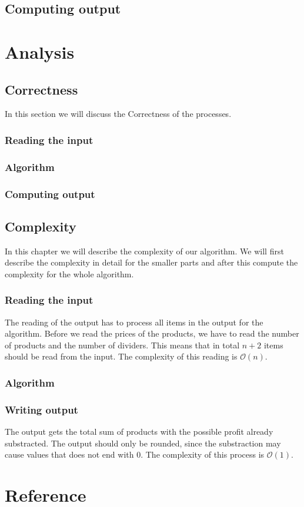 \documentclass{article}
\newcommand{\bigO}[1]{\mathcal{O}(#1)}
\begin{document}
\subsection{Computing output}

\newpage
\section{Analysis}

\subsection{Correctness}
In this section we will discuss the Correctness of the processes.

\subsubsection{Reading the input}

\subsubsection{Algorithm}

\subsubsection{Computing output}

\subsection{Complexity}
In this chapter we will describe the complexity of our algorithm. We will first describe the complexity in detail for the smaller parts and after this compute the complexity for the whole algorithm.

\subsubsection{Reading the input}
The reading of the output has to process all items in the output for the algorithm. Before we read the prices of the products, we have to read the number of products and the number of dividers. This means that in total $n + 2$ items should be read from the input. The complexity of this reading is $\bigO{n}$.

\subsubsection{Algorithm}

\subsubsection{Writing output}
The output gets the total sum of products with the possible profit already substracted. The output should only be rounded, since the substraction may cause values that does not end with 0. The complexity of this process is $\bigO{1}$.

\newpage
\section{Reference}
\end{document}
